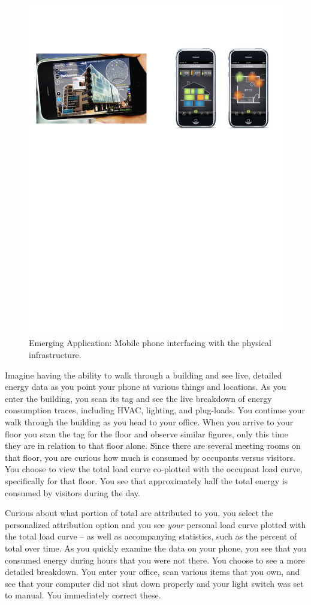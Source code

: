\begin{figure}[h!] %
\centering
\includegraphics[width=0.75\columnwidth]{figs/mobileEnergy1}
\caption{Emerging Application: Mobile phone interfacing with the physical infrastructure.}
\label{fig:mobileEnergy1}
\end{figure}

Imagine having the ability to walk through a building and see live, detailed energy data as
you point your phone at various things and locations.  As you enter the building, you scan its tag and see
the live breakdown of energy consumption traces, including HVAC, lighting, and plug-loads.  You continue
your walk through the building as you head to your office.  When you arrive to your floor
you scan the tag for the floor and observe similar figures, only this time they are in relation to that floor
alone.  Since there are several meeting rooms on that floor, you are curious how much is consumed by 
occupants versus visitors.  You choose to view the total load curve co-plotted with the occupant
load curve, specifically for that floor.  You see that approximately half the total energy is consumed
by visitors during the day.  

Curious about what portion of total are attributed to you, you select the 
personalized attribution option and you see \emph{your} personal load curve plotted
with the total load curve -- as well as accompanying statistics, such as the percent of total over time.
As you quickly examine the data on your phone, you see that you consumed energy during hours that you were not
there.  You choose to see a more detailed breakdown.  You enter your office, scan various items that you own, and see that
your computer did not shut down properly and your light switch was set to manual.  You immediately 
correct these.


